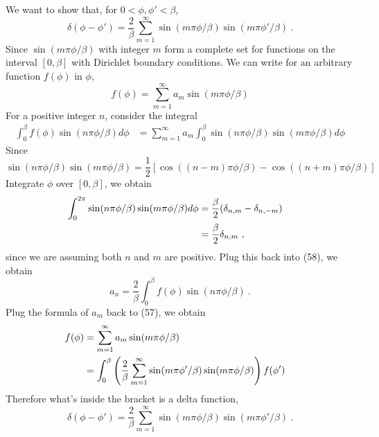 \documentclass[12pt]{article}
\begin{document}
\newpage
{} We want to show that, for $0 < \phi, \phi' < \beta$,
$$
\delta(\phi - \phi') = \frac{2}{\beta} \sum_{m=1}^\infty \sin(m \pi \phi/\beta) \sin(m \pi \phi'/\beta)~.
$$
Since $\sin(m \pi \phi /\beta)$ with integer $m$ form a complete set for functions on the interval $[0, \beta]$ with Dirichlet boundary conditions. We can write for an arbitrary function $f(\phi)$ in $\phi$,
\begin{equation}
    f(\phi) = \sum_{m = 1}^{\infty} a_m \sin(m \pi \phi /\beta)
\end{equation}
For a positive integer $n$, consider the integral
\begin{align}
    \int_0^{\beta} f(\phi) \sin(n \pi \phi/\beta) d\phi &= \sum_{m=1}^{\infty} a_m \int_0^\beta \sin(n\pi \phi/\beta) \sin(m \pi \phi /\beta) d\phi
\end{align}
Since
\begin{equation}
    \sin(n\pi \phi /\beta) \sin(m\pi \phi/\beta) = \frac12 [\cos((n-m)\pi \phi/\beta) -\cos((n+m)\pi \phi/\beta)]
\end{equation}
Integrate $\phi$ over $[0, \beta]$, we obtain
\begin{align}
    \int_0^{2\pi} \sin(n\pi \phi/\beta) \sin(m \pi \phi/\beta) d\phi &= \frac{\beta}{2} (\delta_{n,m} - \delta_{n,-m}) \cr
    &= \frac{\beta}{2} \delta_{n,m}~,
\end{align}
since we are assuming both $n$ and $m$ are positive. Plug this back into (58), we obtain
\begin{equation}
    a_n = \frac{2}{\beta} \int_0^\beta f(\phi) \sin(n \pi \phi /\beta)~.
\end{equation}
Plug the formula of $a_m$ back to (57), we obtain
\begin{align}
    f(\phi) &= \sum_{m = 1}^\infty a_m \sin(m \pi \phi/\beta)\cr
    &= \int_0^\beta \left(\frac 2 \beta \sum_{m=1}^\infty \sin(m \pi \phi'/\beta) \sin(m \pi \phi /\beta)\right) f(\phi')
\end{align}
Therefore what's inside the bracket is a delta function,
\begin{equation}
    \delta(\phi - \phi') = \frac{2}{\beta} \sum_{m=1}^\infty \sin(m \pi \phi/\beta) \sin(m \pi \phi'/\beta)~.
\end{equation}
\end{document}
